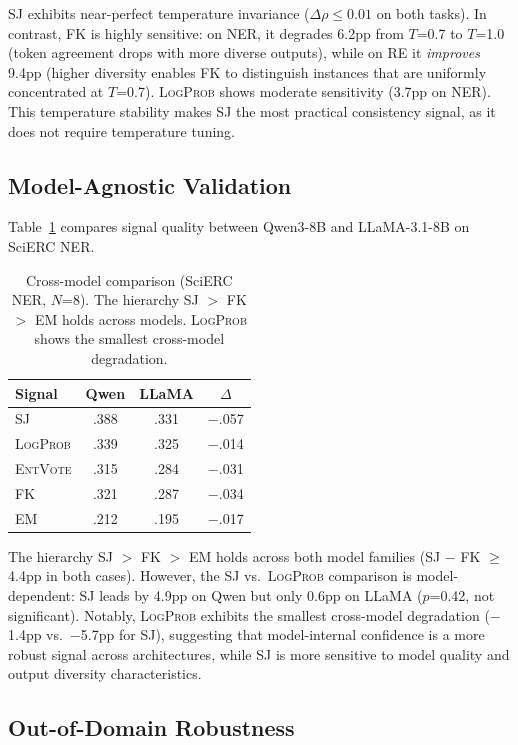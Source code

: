 \documentclass[11pt,a4paper]{article}
\newcommand{\SJ}{\textsc{SJ}}
\newcommand{\FK}{\textsc{FK}}
\newcommand{\LP}{\textsc{LogProb}}
\newcommand{\EM}{\textsc{EM}}
\newcommand{\EV}{\textsc{EntVote}}
\begin{document}
\SJ{} exhibits near-perfect temperature invariance ($\Delta\rho \leq 0.01$ on both tasks).
In contrast, \FK{} is highly sensitive: on NER, it degrades 6.2pp from $T$=0.7 to $T$=1.0 (token agreement drops with more diverse outputs), while on RE it \emph{improves} 9.4pp (higher diversity enables \FK{} to distinguish instances that are uniformly concentrated at $T$=0.7).
\LP{} shows moderate sensitivity (3.7pp on NER).
This temperature stability makes \SJ{} the most practical consistency signal, as it does not require temperature tuning.

\subsection{Model-Agnostic Validation}
\label{sec:multimodel}

Table~\ref{tab:multimodel} compares signal quality between Qwen3-8B and LLaMA-3.1-8B on SciERC NER.

\begin{table}[t]
\centering
\small
\begin{tabular}{l cc c}
\toprule
\textbf{Signal} & Qwen & LLaMA & $\Delta$ \\
\midrule
\SJ{} & .388 & .331 & $-$.057 \\
\LP{} & .339 & .325 & $-$.014 \\
\EV{} & .315 & .284 & $-$.031 \\
\FK{} & .321 & .287 & $-$.034 \\
\EM{} & .212 & .195 & $-$.017 \\
\bottomrule
\end{tabular}
\caption{Cross-model comparison (SciERC NER, $N$=8). The hierarchy \SJ{} $>$ \FK{} $>$ \EM{} holds across models. \LP{} shows the smallest cross-model degradation.}
\label{tab:multimodel}
\end{table}

The hierarchy \SJ{} $>$ \FK{} $>$ \EM{} holds across both model families (\SJ{} $-$ \FK{} $\geq$ 4.4pp in both cases).
However, the \SJ{} vs.\ \LP{} comparison is model-dependent: \SJ{} leads by 4.9pp on Qwen but only 0.6pp on LLaMA ($p$=0.42, not significant).
Notably, \LP{} exhibits the smallest cross-model degradation ($-$1.4pp vs.\ $-$5.7pp for \SJ{}), suggesting that model-internal confidence is a more robust signal across architectures, while \SJ{} is more sensitive to model quality and output diversity characteristics.

\subsection{Out-of-Domain Robustness}
\label{sec:ood}
\end{document}
